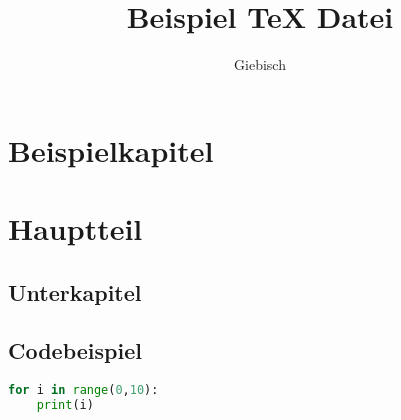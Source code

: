 \documentclass{uni}
\title{Beispiel TeX Datei}
\author{Giebisch}
\begin{document}
    \Title
    \begin{abstract}
        \lipsum[1]
    \end{abstract}
    \newpage
    \tableofcontents
    \newpage

    \section{Beispielkapitel}
    \lipsum[1-3]
    \section{Hauptteil}
    \lipsum[1]
    \subsection{Unterkapitel}
    \lipsum[1]
    \subsection{Codebeispiel}
    \begin{lstlisting}[language=Python]
for i in range(0,10):
    print(i)
    \end{lstlisting}
\end{document}
